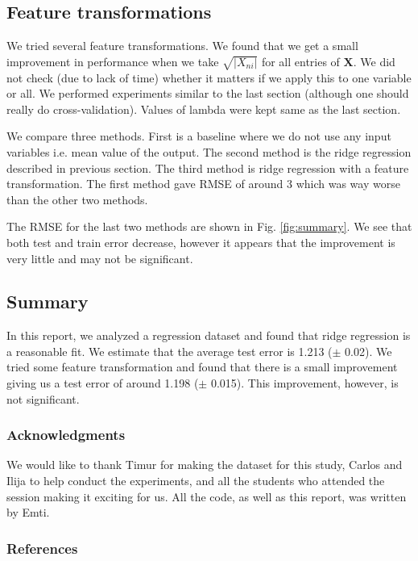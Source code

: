 \documentclass{article} %
\begin{document}
\subsection{Feature transformations}
We tried several feature transformations. We found that we get a small improvement in performance when we take $\sqrt{|X_{ni}|}$ for all entries of $\mathbf{X}$. We did not check (due to lack of time) whether it matters if we apply this to one variable or all. We performed experiments similar to the last section (although one should really do cross-validation). Values of lambda were kept same as the last section. 

We compare three methods. First is a baseline where we do not use any input variables i.e. mean value of the output. The second method is the ridge regression described in previous section. The third method is ridge regression with a feature transformation. The first method gave RMSE of around 3 which was way worse than the other two methods.

The RMSE for the last two methods are shown in Fig. \ref{fig:summary}. We see that both test and train error decrease, however it appears that the improvement is very little and may not be significant.


\begin{figure}[!h]
\center
{}
\hfill
{}
\caption{}
\end{figure}


\subsection{Summary}
In this report, we analyzed a regression dataset and found that ridge regression is a reasonable fit. We estimate that the average test error is 1.213 ($\pm$ 0.02). We tried some feature transformation and found that there is a small improvement giving us a test error of around 1.198 ($\pm$ 0.015). This improvement, however, is not significant.


\subsubsection*{Acknowledgments}
We would like to thank Timur for making the dataset for this study, Carlos and Ilija to help conduct the experiments, and all the students who attended the session making it exciting for us. All the code, as well as this report, was written by Emti. 

\subsubsection*{References}
\end{document}
